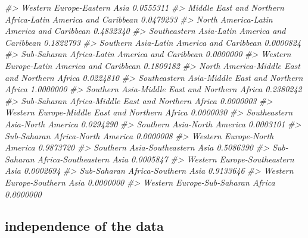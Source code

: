 \documentclass[
]{book}
\newenvironment{Shaded}{\begin{snugshade}}{\end{snugshade}}
\newcommand{\CommentTok}[1]{\textcolor[rgb]{0.56,0.35,0.01}{\textit{#1}}}
\theoremstyle{definition}
\theoremstyle{definition}
\theoremstyle{definition}
\theoremstyle{definition}
\theoremstyle{remark}
\begin{document}
\begin{Shaded}
\begin{Highlighting}[]
\CommentTok{\#\textgreater{} Western Europe{-}Eastern Asia                                 0.0555311}
\CommentTok{\#\textgreater{} Middle East and Northern Africa{-}Latin America and Caribbean 0.0479233}
\CommentTok{\#\textgreater{} North America{-}Latin America and Caribbean                   0.4832340}
\CommentTok{\#\textgreater{} Southeastern Asia{-}Latin America and Caribbean               0.1822793}
\CommentTok{\#\textgreater{} Southern Asia{-}Latin America and Caribbean                   0.0000824}
\CommentTok{\#\textgreater{} Sub{-}Saharan Africa{-}Latin America and Caribbean              0.0000000}
\CommentTok{\#\textgreater{} Western Europe{-}Latin America and Caribbean                  0.1809182}
\CommentTok{\#\textgreater{} North America{-}Middle East and Northern Africa               0.0224810}
\CommentTok{\#\textgreater{} Southeastern Asia{-}Middle East and Northern Africa           1.0000000}
\CommentTok{\#\textgreater{} Southern Asia{-}Middle East and Northern Africa               0.2380242}
\CommentTok{\#\textgreater{} Sub{-}Saharan Africa{-}Middle East and Northern Africa          0.0000003}
\CommentTok{\#\textgreater{} Western Europe{-}Middle East and Northern Africa              0.0000030}
\CommentTok{\#\textgreater{} Southeastern Asia{-}North America                             0.0294290}
\CommentTok{\#\textgreater{} Southern Asia{-}North America                                 0.0003101}
\CommentTok{\#\textgreater{} Sub{-}Saharan Africa{-}North America                            0.0000008}
\CommentTok{\#\textgreater{} Western Europe{-}North America                                0.9873720}
\CommentTok{\#\textgreater{} Southern Asia{-}Southeastern Asia                             0.5086390}
\CommentTok{\#\textgreater{} Sub{-}Saharan Africa{-}Southeastern Asia                        0.0005847}
\CommentTok{\#\textgreater{} Western Europe{-}Southeastern Asia                            0.0002694}
\CommentTok{\#\textgreater{} Sub{-}Saharan Africa{-}Southern Asia                            0.9133646}
\CommentTok{\#\textgreater{} Western Europe{-}Southern Asia                                0.0000000}
\CommentTok{\#\textgreater{} Western Europe{-}Sub{-}Saharan Africa                           0.0000000}
\end{Highlighting}
\end{Shaded}

\hypertarget{independence-of-the-data}{%
\subsection{independence of the data}\label{independence-of-the-data}}
\end{document}
